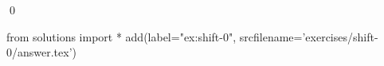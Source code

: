 
\begin{ex} 
  \label{ex:shift-0}
  
  \qed
\end{ex} 
\begin{python0}
from solutions import *
add(label="ex:shift-0",
    srcfilename='exercises/shift-0/answer.tex') 
\end{python0}
